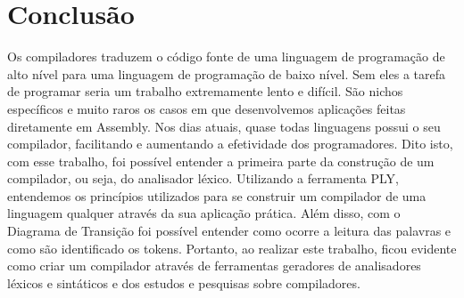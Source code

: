 \documentclass[
	12pt,				%
	openright,			%
	twoside,			%
	a4paper,			%
	english,			%
	french,				%
	spanish,			%
	brazil				%
	]{abntex2}
\begin{document}

\chapter*[Conclusão]{Conclusão}
Os compiladores traduzem o código fonte de uma linguagem de programação
de alto nível para uma linguagem de programação de baixo nível. Sem eles 
a tarefa de programar seria um trabalho extremamente lento e difícil.
São nichos específicos e muito raros os casos em que desenvolvemos
aplicações feitas diretamente em Assembly. Nos dias atuais, quase todas linguagens
possui o seu compilador, facilitando e aumentando a efetividade dos programadores.
Dito isto, com esse trabalho, foi possível entender a primeira parte da construção
de um compilador, ou seja, do analisador léxico. Utilizando a ferramenta PLY,
entendemos os princípios utilizados para se construir um compilador de uma
linguagem qualquer através da sua aplicação prática. Além disso, com o Diagrama
de Transição foi possível entender como ocorre a leitura das palavras e como são
identificado os tokens. Portanto, ao realizar este trabalho,
ficou evidente como criar um compilador através de ferramentas geradores de 
analisadores léxicos e sintáticos e dos estudos e pesquisas sobre compiladores.


\postextual



%
%

\printindex
\end{document}

